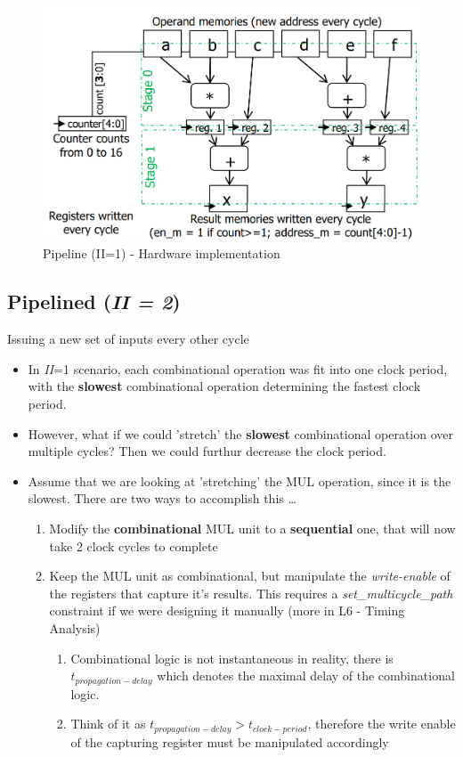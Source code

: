 \documentclass{article}
\begin{document}
\begin{figure}[htp]
    \centering
    \includegraphics[width=12cm, scale=1]{S2/pipeline_II1_hardware.PNG}
    \caption{Pipeline (II=1) - Hardware implementation}
\end{figure}

\newpage
\subsection{Pipelined (\textit{II = 2})}
Issuing a new set of inputs every other cycle

\begin{itemize}
    \item In \textit{II}=1 scenario, each combinational operation was fit into one clock period, with the \textbf{slowest} combinational operation determining the fastest clock period.
    \item However, what if we could 'stretch' the \textbf{slowest} combinational operation over multiple cycles? Then we could furthur decrease the clock period.
    \item Assume that we are looking at 'stretching' the MUL operation, since it is the slowest. There are two ways to accomplish this \dots
        \begin{enumerate}[label*=\arabic*.]
            \item Modify the \textbf{combinational} MUL unit to a \textbf{sequential} one, that will now take 2 clock cycles to complete
            \item Keep the MUL unit as combinational, but manipulate the \textit{write-enable} of the registers that capture it's results.
                    This requires a \textit{set\_multicycle\_path} constraint if we were designing it manually (more in L6 - Timing Analysis)
            \begin{enumerate}[label*=\arabic*.]
                \item Combinational logic is not instantaneous in reality, there is $t_{propagation-delay}$ which denotes the maximal delay of the combinational logic.
                \item Think of it as $t_{propagation-delay} > t_{clock-period}$, therefore the write enable of the capturing register must be manipulated accordingly
            \end{enumerate}
        \end{enumerate}
\end{itemize}
\end{document}
